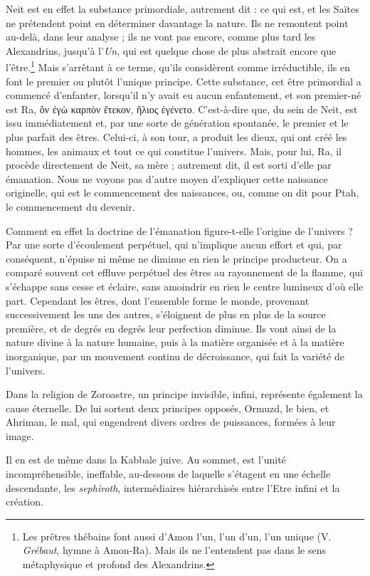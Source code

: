 \documentclass[a4paper, 11pt, oneside]{article}
\begin{document}
Neit est en effet la substance primordiale, autrement dit : ce qui est, et les Saïtes ne prétendent point en déterminer davantage la nature. Ils ne remontent point au-delà, dans leur analyse ; ils ne vont pas encore, comme plus tard les Alexandrins, jusqu'à l'\emph{Un}, qui est quelque chose de plus abstrait encore que l'être.\footnote{Les prêtres thébains font aussi d'Amon l'un, l'un d’un, l'un unique (V. \emph{Grébaut}, hymne à Amon-Ra). Mais ils ne l'entendent pas dans le sens métaphysique et profond des Alexandrins.} Mais s'arrêtant à ce terme, qu'ils considèrent comme irréductible, ils en font le premier ou plutôt l'unique principe. Cette substance, cet être primordial a commencé d'enfanter, lorsqu'il n'y avait eu aucun enfantement, et son premier-né est Ra, ὅν ἐγὼ καρπὸν ἔτεκον, ἥλιος ἐγένετο. C'est-à-dire que, du sein de Neit, est issu immédiatement et, par une sorte de génération spontanée, le premier et le plus parfait des êtres. Celui-ci, à son tour, a produit les dieux, qui ont créé les hommes, les animaux et tout ce qui constitue l'univers. Mais, pour lui, Ra, il procède directement de Neit, sa mère ; autrement dit, il est sorti d'elle par émanation. Nous ne voyons pas d'autre moyen d'expliquer cette naissance originelle, qui est le commencement des naissances, ou, comme on dit pour Ptah, le commencement du devenir.

Comment en effet la doctrine de l'émanation figure-t-elle l'origine de l'univers ? Par une sorte d'écoulement perpétuel, qui n'implique aucun effort et qui, par conséquent, n'épuise ni même ne diminue en rien le principe producteur. On a comparé souvent cet effluve perpétuel des êtres au rayonnement de la flamme, qui s'échappe sans cesse et éclaire, sans amoindrir en rien le centre lumineux d'où elle part. Cependant les êtres, dont l'ensemble forme le monde, provenant successivement les uns des autres, s'éloignent de plus en plus de la source première, et de degrés en degrés leur perfection diminue. Ils vont ainsi de la nature divine à la nature humaine, puis à la matière organisée et à la matière inorganique, par un mouvement continu de décroissance, qui fait la variété de l'univers.

Dans la religion de Zoroastre, un principe invisible, infini, représente également la cause éternelle. De lui sortent deux principes opposés, Ormuzd, le bien, et Ahriman, le mal, qui engendrent divers ordres de puissances, formées à leur image.

Il en est de même dans la Kabbale juive. Au sommet, est l'unité incompréhensible, ineffable, au-dessous de laquelle s'étagent en une échelle descendante, les \emph{sephiroth}, intermédiaires hiérarchisés entre l'Etre infini et la création.
\end{document}
